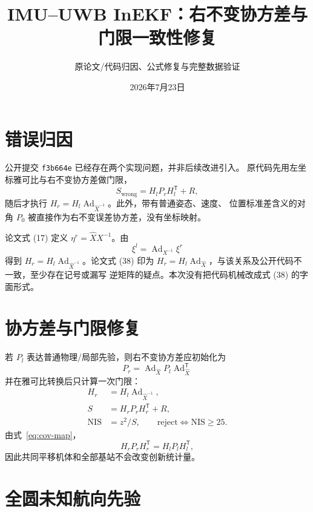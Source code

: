 \documentclass[11pt,a4paper]{ctexart}
\title{IMU--UWB InEKF：右不变协方差与门限一致性修复}
\author{原论文/代码归因、公式修复与完整数据验证}
\date{2026年7月23日}
\begin{document}
\maketitle

\section{错误归因}

公开提交 \texttt{f3b664e} 已经存在两个实现问题，并非后续改进引入。
原代码先用左坐标雅可比与右不变协方差做门限，
\begin{equation}
 S_{\mathrm{wrong}}=H_lP_rH_l^{\mathsf T}+R,
\end{equation}
随后才执行 $H_r=H_l\operatorname{Ad}_{\hat X^{-1}}$。此外，带有普通姿态、速度、
位置标准差含义的对角 $P_0$ 被直接作为右不变误差协方差，没有坐标映射。

论文式 (17) 定义 $\eta^r=\hat X X^{-1}$。由
\begin{equation}
 \xi^l=\operatorname{Ad}_{X^{-1}}\xi^r
\end{equation}
得到 $H_r=H_l\operatorname{Ad}_{\hat X^{-1}}$。论文式 (38) 印为
$H_r=H_l\operatorname{Ad}_{\hat X}$，与该关系及公开代码不一致，至少存在记号或漏写
逆矩阵的疑点。本次没有把代码机械改成式 (38) 的字面形式。

\section{协方差与门限修复}

若 $P_l$ 表达普通物理/局部先验，则右不变协方差应初始化为
\begin{equation}
 \boxed{
 P_r=\operatorname{Ad}_{\hat X}P_l\operatorname{Ad}_{\hat X}^{\mathsf T}}
 \label{eq:cov-map}
\end{equation}
并在雅可比转换后只计算一次门限：
\begin{align}
 H_r&=H_l\operatorname{Ad}_{\hat X^{-1}},\\
 S&=H_rP_rH_r^{\mathsf T}+R,\\
 \mathrm{NIS}&=z^2/S,\qquad
 \mathrm{reject}\Longleftrightarrow\mathrm{NIS}\ge25.
\end{align}
由式~\eqref{eq:cov-map}，
\begin{equation}
 H_rP_rH_r^{\mathsf T}
 =H_lP_lH_l^{\mathsf T},
\end{equation}
因此共同平移机体和全部基站不会改变创新统计量。

\section{全圆未知航向先验}
\end{document}
